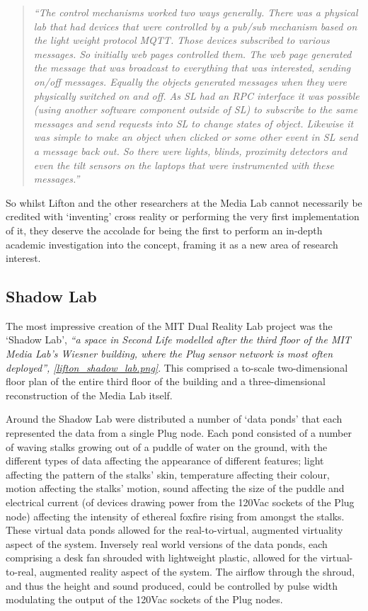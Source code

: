 \begin{quote}
\textit{``The control mechanisms worked two ways generally. There was a physical lab that had devices that were controlled by a pub/sub mechanism based on the light weight protocol MQTT. Those devices subscribed to various messages. So initially web pages controlled them. The web page generated the message that was broadcast to everything that was interested, sending on/off messages. Equally the objects generated messages when they were physically switched on and off. As SL had an RPC interface it was possible (using another software component outside of SL) to subscribe to the same messages and send requests into SL to change states of object. Likewise it was simple to make an object when clicked or some other event in SL send a message back out. So there were lights, blinds, proximity detectors and even the tilt sensors on the laptops that were instrumented with these messages.''}
\end{quote}

So whilst Lifton and the other researchers at the Media Lab cannot necessarily be credited with `inventing' cross reality or performing the very first implementation of it, they deserve the accolade for being the first to perform an in-depth academic investigation into the concept, framing it as a new area of research interest.

\subsection{Shadow Lab}
\label{subsec:mit_shadow_lab}
The most impressive creation of the MIT Dual Reality Lab project was the `Shadow Lab', \textit{``a space in Second Life modelled after the third floor of the MIT Media Lab's Wiesner building, where the Plug sensor network is most often deployed'', \ref{lifton_shadow_lab.png}}. This comprised a to-scale two-dimensional floor plan of the entire third floor of the building and a three-dimensional reconstruction of the Media Lab itself.

Around the Shadow Lab were distributed a number of `data ponds' that each represented the data from a single Plug node. Each pond consisted of a number of waving stalks growing out of a puddle of water on the ground, with the different types of data affecting the appearance of different features; light affecting the pattern of the stalks' skin, temperature affecting their colour, motion affecting the stalks' motion, sound affecting the size of the puddle and electrical current (of devices drawing power from the 120Vac sockets of the Plug node) affecting the intensity of ethereal foxfire rising from amongst the stalks. These virtual data ponds allowed for the real-to-virtual, augmented virtuality aspect of the system. Inversely real world versions of the data ponds, each comprising a desk fan shrouded with lightweight plastic, allowed for the virtual-to-real, augmented reality aspect of the system. The airflow through the shroud, and thus the height and sound produced, could be controlled by pulse width modulating the output of the 120Vac sockets of the Plug nodes.

